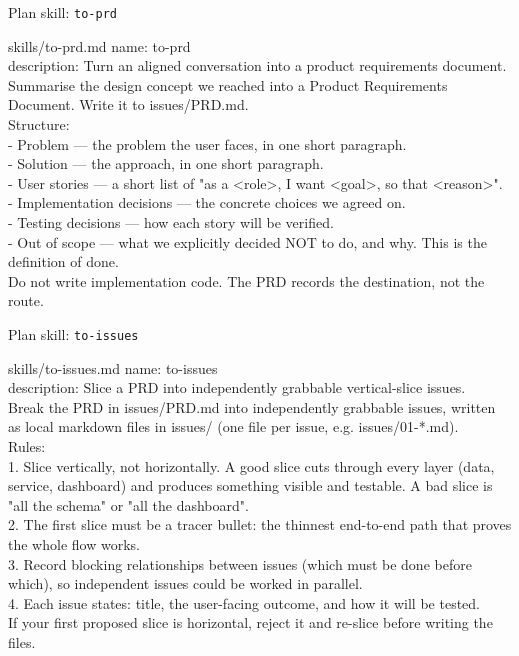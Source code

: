 \begin{frame}{Plan skill: \texttt{to-prd}}
  \begin{tdcodet}{skills/to-prd.md}
    name: to-prd\\
    description: Turn an aligned conversation into a product requirements document.\\[3pt]
    Summarise the design concept we reached into a Product Requirements Document. Write it to issues/PRD.md.\\[3pt]
    Structure:\\[2pt]
    - Problem --- the problem the user faces, in one short paragraph.\\
    - Solution --- the approach, in one short paragraph.\\
    - User stories --- a short list of "as a <role>, I want <goal>, so that <reason>".\\
    - Implementation decisions --- the concrete choices we agreed on.\\
    - Testing decisions --- how each story will be verified.\\
    - Out of scope --- what we explicitly decided NOT to do, and why. This is the definition of done.\\[3pt]
    Do not write implementation code. The PRD records the destination, not the route.
  \end{tdcodet}
\end{frame}

\begin{frame}{Plan skill: \texttt{to-issues}}
  \begin{tdcodet}{skills/to-issues.md}
    \tiny
    name: to-issues\\
    description: Slice a PRD into independently grabbable vertical-slice issues.\\[3pt]
    Break the PRD in issues/PRD.md into independently grabbable issues, written as local markdown files in issues/ (one file per issue, e.g. issues/01-*.md).\\[3pt]
    Rules:\\[2pt]
    1. Slice vertically, not horizontally. A good slice cuts through every layer (data, service, dashboard) and produces something visible and testable. A bad slice is "all the schema" or "all the dashboard".\\
    2. The first slice must be a tracer bullet: the thinnest end-to-end path that proves the whole flow works.\\
    3. Record blocking relationships between issues (which must be done before which), so independent issues could be worked in parallel.\\
    4. Each issue states: title, the user-facing outcome, and how it will be tested.\\[3pt]
    If your first proposed slice is horizontal, reject it and re-slice before writing the files.
  \end{tdcodet}
\end{frame}

